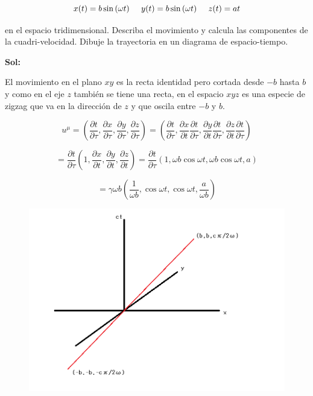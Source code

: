 \documentclass[12pt,a4paper]{article}
\begin{document}
\begin{enumerate}
\begin{equation*}
    x(t) =b\sin{(\omega t)} \hspace{0.5cm} y(t) = b \sin{(\omega t)} \hspace{0.5cm} z(t) = at
\end{equation*}

en el espacio tridimensional. Describa el movimiento y calcula las componentes de la cuadri-velocidad. Dibuje la trayectoria en un diagrama de espacio-tiempo.

\textbf{Sol:}

El movimiento en el plano $xy$ es la recta identidad pero cortada desde $-b$ hasta $b$ y como en el eje $z$ también se tiene una recta, en el espacio $xyz$ es una especie de zigzag que  va en la dirección de $z$ y que oscila entre $-b$ y $b$.

\begin{equation*}
    u^{\mu}= \left(\frac{\partial t}{\partial \tau}, \frac{\partial x}{\partial \tau},\frac{\partial y}{\partial \tau}, \frac{\partial z}{\partial \tau}\right) = \left(\frac{\partial t}{\partial \tau}, \frac{\partial x}{\partial t}\frac{\partial t}{\partial \tau},\frac{\partial y}{\partial t}\frac{\partial t}{\partial \tau}, \frac{\partial z}{\partial t}\frac{\partial t}{\partial \tau}\right)
\end{equation*}

\begin{equation*}
    =\frac{\partial t}{\partial \tau}\left(1, \frac{\partial x}{\partial t},\frac{\partial y}{\partial t}, \frac{\partial z}{\partial t}\right)=\frac{\partial t}{\partial \tau}\left(1, \omega b \cos{\omega t},\omega b \cos{\omega t}, a\right)
\end{equation*}

\begin{equation*}
    =\gamma\omega b\left(\frac{1}{\omega b}, \cos{\omega t},\cos{\omega t}, \frac{a}{\omega b}\right)
\end{equation*}

\newpage

\begin{figure}[h!]
    \centering
    \includegraphics[scale=0.4]{xy rela.png}
\end{figure}


\end{enumerate}
\end{document}
